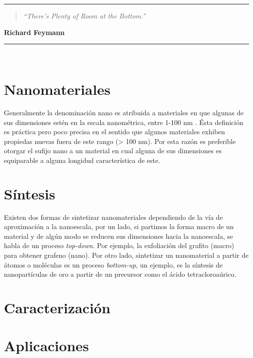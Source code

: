 \noindent
\rule{\linewidth}{1 pt}
\begin{flushright}
	\begin{quotation}
		\small{
			\textit{``There’s Plenty of Room at the Bottom.''}}
	\end{quotation}
	\bf{Richard Feymann}
\end{flushright}
\noindent
\rule{\linewidth}{1 pt}\\
\vfill
\section{Nanomateriales}
Generalmente la denominación nano es atribuida a materiales en que algunas de sus dimensiones estén en la escala nanométrica, entre 1-100 nm \cite{Gressler2013}. Ésta definición es práctica pero poco precisa en el sentido que algunos materiales exhiben propiedas nuevas fuera de este rango (> 100 nm). Por esta razón es preferible otorgar el sufijo nano a un material en cual alguna de sus dimensiones es equiparable a alguna longidud característica de este.

\section{Síntesis}
Existen dos formas de sintetizar nanomateriales dependiendo de la vía de aproximación a la nanoescala, por un lado, si partimos la forma macro de un material y de algún modo se reducen sus dimensiones hacia la nanoescala, se habla de un proceso \textit{top-down}. Por ejemplo, la exfoliación del grafito (macro) para obtener grafeno (nano).  Por otro lado, sintetizar un nanomaterial a partir de átomos o moléculas es un proceso \textit{bottom-up}, un ejemplo, es la síntesis de nanopartículas de oro a partir de un precursor como el ácido tetracloroaúrico.

\section{Caracterización}

\section{Aplicaciones}

